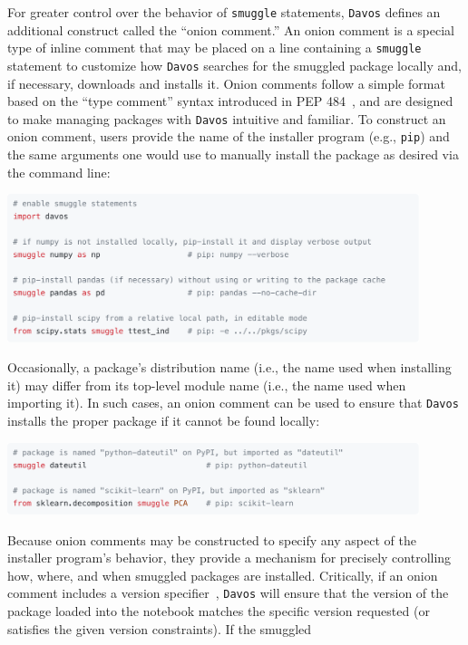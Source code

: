 \documentclass[preprint,12pt,a4paper]{elsarticle}
\begin{document}
For greater control over the behavior of \texttt{smuggle} statements, \texttt{Davos}
defines an additional construct called the ``onion comment.'' An onion comment
is a special type of inline comment that may be placed on a line containing a
\texttt{smuggle} statement to customize how \texttt{Davos} searches for the smuggled
package locally and, if necessary, downloads and installs it. Onion comments
follow a simple format based on the ``type comment'' syntax introduced in PEP
484~\cite{vanREtal14}, and are designed to make managing packages with \texttt{Davos}
intuitive and familiar. To construct an onion comment, users provide the name
of the installer program (e.g., \texttt{pip}) and the same arguments one would
use to manually install the package as desired via the command line:
\begin{center}
  \includegraphics[width=0.9\textwidth]{figs/snippet1}
\end{center}
Occasionally, a package's distribution name (i.e., the name used
when installing it) may differ from its top-level module name (i.e., the name
used when importing it). In such cases, an onion comment can be used to ensure
that \texttt{Davos} installs the proper package if it cannot be found locally:
\begin{center}
  \includegraphics[width=0.9\textwidth]{figs/snippet2}
\end{center}
Because onion comments may be constructed to specify any aspect of
the installer program's behavior, they provide a mechanism for precisely controlling
how, where, and when smuggled packages are installed. Critically, if an onion
comment includes a version specifier~\cite{CoghStuf13}, \texttt{Davos} will ensure that
the version of the package loaded into the notebook matches the specific
version requested (or satisfies the given version constraints). If the smuggled
\end{document}
